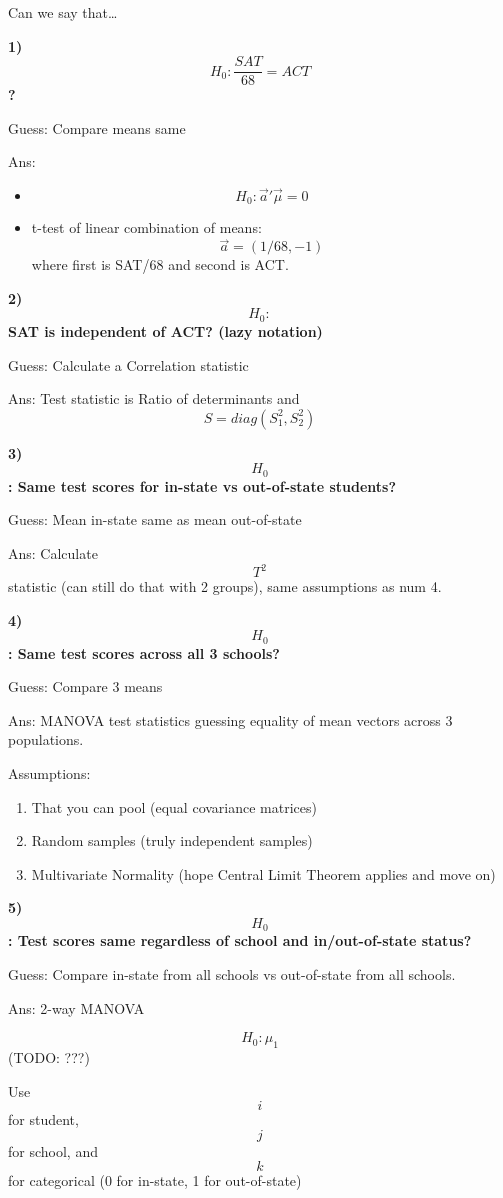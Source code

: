 Can we say that\ldots{}

\textbf{1)} \[H_0: \frac{SAT}{68} = ACT\] \textbf{?}

Guess: Compare means same

Ans:

\begin{itemize}
\tightlist
\item
  \[H_0: \vec{a}'\vec{\mu} = 0\]
\item
  t-test of linear combination of means: \[ \vec{a} = (1/68, -1)\]where
  first is SAT/68 and second is ACT.
\end{itemize}

\textbf{2)} \[H_0:\] \textbf{SAT is independent of ACT? (lazy notation)}

Guess: Calculate a Correlation statistic

Ans: Test statistic is Ratio of determinants and
\[ S = diag(S_1^2, S_2^2) \]

\textbf{3)} \[H_0\]\textbf{: Same test scores for in-state vs
out-of-state students?}

Guess: Mean in-state same as mean out-of-state

Ans: Calculate \[T^2\] statistic (can still do that with 2 groups), same
assumptions as num 4.

\textbf{4)} \[H_0\]\textbf{: Same test scores across all 3 schools?}

Guess: Compare 3 means

Ans: MANOVA test statistics guessing equality of mean vectors across 3
populations.

Assumptions:

\begin{enumerate}
\def\labelenumi{\arabic{enumi}.}
\item
  That you can pool (equal covariance matrices)
\item
  Random samples (truly independent samples)
\item
  Multivariate Normality (hope Central Limit Theorem applies and move
  on)
\end{enumerate}

\textbf{5)} \[H_0\]\textbf{: Test scores same regardless of school and
in/out-of-state status?}

Guess: Compare in-state from all schools vs out-of-state from all
schools.

Ans: 2-way MANOVA

\[H_0: \mu_1 \] (TODO: ???)

Use \[i\] for student, \[j\] for school, and \[k\] for categorical (0
for in-state, 1 for out-of-state)

